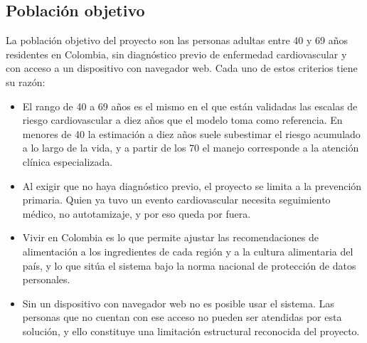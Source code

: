 \documentclass[conference]{IEEEtran}
\begin{document}
\subsection{Población objetivo}
La población objetivo del proyecto son las personas adultas entre 40 y 69 años residentes en Colombia, sin diagnóstico previo de enfermedad cardiovascular y con acceso a un dispositivo con navegador web. Cada uno de estos criterios tiene su razón:

\begin{itemize}
\item El rango de 40 a 69 años es el mismo en el que están validadas las escalas de riesgo cardiovascular a diez años que el modelo toma como referencia. En menores de 40 la estimación a diez años suele subestimar el riesgo acumulado a lo largo de la vida, y a partir de los 70 el manejo corresponde a la atención clínica especializada.
\item Al exigir que no haya diagnóstico previo, el proyecto se limita a la prevención primaria. Quien ya tuvo un evento cardiovascular necesita seguimiento médico, no autotamizaje, y por eso queda por fuera.
\item Vivir en Colombia es lo que permite ajustar las recomendaciones de alimentación a los ingredientes de cada región y a la cultura alimentaria del país, y lo que sitúa el sistema bajo la norma nacional de protección de datos personales.
\item Sin un dispositivo con navegador web no es posible usar el sistema. Las personas que no cuentan con ese acceso no pueden ser atendidas por esta solución, y ello constituye una limitación estructural reconocida del proyecto.
\end{itemize}
\end{document}
